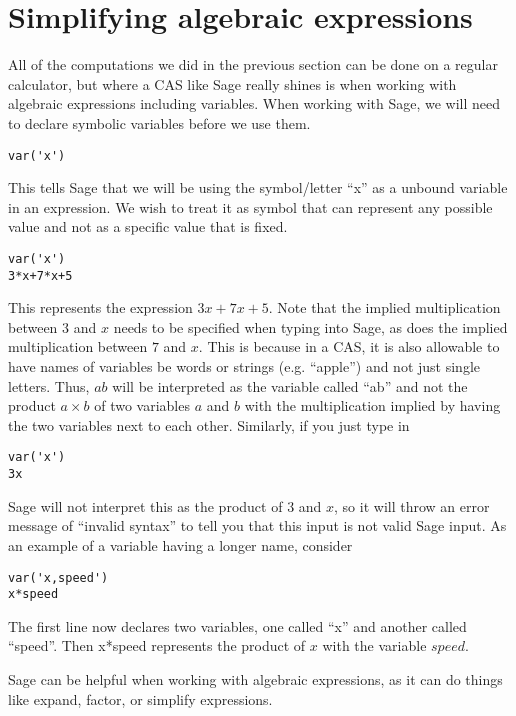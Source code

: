 \documentclass[12pt]{amsart}
\theoremstyle{definition}
\theoremstyle{definition}
\begin{document}
\section{Simplifying algebraic expressions}

All of the computations we did in the previous section can be
done on a regular calculator, but where a CAS like Sage really
shines is when working with algebraic expressions including
variables. When working with Sage, we will need to declare
symbolic variables before we use them.

\begin{verbatim}
var('x')
\end{verbatim}

This tells Sage that we will be using the symbol/letter ``x'' as a
unbound variable in an expression. We wish to treat it as symbol
that can represent any possible value and not as a specific
value that is fixed.

\begin{verbatim}
var('x')
3*x+7*x+5
\end{verbatim}

This represents the expression $3x+7x+5$. Note that the implied
multiplication between $3$ and $x$ needs to be specified when
typing into Sage, as does the implied multiplication between
$7$ and $x$. This is because in a CAS, it is also allowable to
have names of variables be words or strings (e.g. ``apple'') and not just
single letters. Thus, $ab$ will be interpreted as the variable called
``ab'' and not the product $a \times b$ of two variables $a$ and $b$
with the multiplication implied by having the two variables next to
each other. Similarly, if you just type in

\begin{verbatim}
var('x')
3x
\end{verbatim}

Sage will not interpret this as the product of $3$ and $x$, so it
will throw an error message of ``invalid syntax'' to tell you that this
input is not valid Sage input. As an example of a variable having
a longer name, consider

\begin{verbatim}
var('x,speed')
x*speed
\end{verbatim}

The first line now declares two variables, one called ``x'' and another
called ``speed''. Then x*speed represents the product of $x$ with the variable
$speed$.

Sage can be helpful when working with algebraic expressions, as
it can do things like expand, factor, or simplify expressions.
\end{document}
